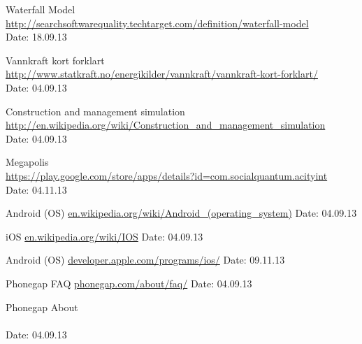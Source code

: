 \begin{thebibliography}{99}
	Waterfall Model \\
	\href {http://searchsoftwarequality.techtarget.com/definition/waterfall-model}{http://searchsoftwarequality.techtarget.com/definition/waterfall-model} \\
	Date: 18.09.13

	Vannkraft kort forklart \\
	\href {http://www.statkraft.no/energikilder/vannkraft/vannkraft-kort-forklart/}{http://www.statkraft.no/energikilder/vannkraft/vannkraft-kort-forklart/} \\
	Date: 04.09.13

	Construction and management simulation \\
	\href {http://en.wikipedia.org/wiki/Construction_and_management_simulation}{http://en.wikipedia.org/wiki/Construction\_and\_management\_simulation} \\
	Date: 04.09.13

	Megapolis \\
	\href {https://play.google.com/store/apps/details?id=com.socialquantum.acityint}{https://play.google.com/store/apps/details?id=com.socialquantum.acityint} \\
	Date: 04.11.13

	Android (OS)\newline
	\href {http://en.wikipedia.org/wiki/Android\_(operating_system)}{en.wikipedia.org/wiki/Android\_(operating\_system)}\newline
	Date: 04.09.13

	iOS\newline
	\href {http://en.wikipedia.org/wiki/IOS}{en.wikipedia.org/wiki/IOS}\newline
	Date: 04.09.13

	Android (OS)\newline
	\href {https://developer.apple.com/programs/ios/}{developer.apple.com/programs/ios/}\newline
	Date: 09.11.13

	Phonegap FAQ\newline
	\href {http://phonegap.com/about/faq/}{phonegap.com/about/faq/}\newline
	Date: 04.09.13

	Phonegap About \\
	\href{http://phonegap.com/about/} \\
	Date: 04.09.13


\end{thebibliography}
